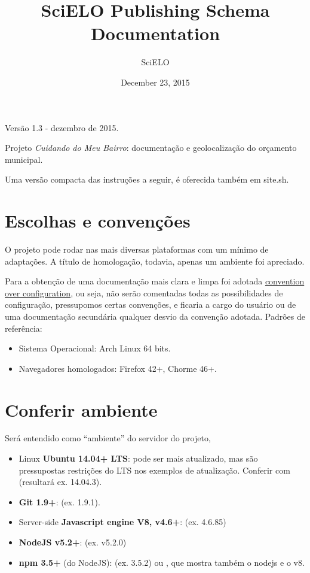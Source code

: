 \documentclass[letterpaper,10pt,english]{sphinxmanual}
\title{SciELO Publishing Schema Documentation}
\date{December 23, 2015}
\author{SciELO}
\begin{document}
\maketitle
\tableofcontents
{}\label{index::doc}


Versão 1.3 - dezembro de 2015.

Projeto \emph{Cuidando do Meu Bairro}: documentação e geolocalização do orçamento municipal.

Uma versão compacta das instruções a seguir, é oferecida também em site.sh.


\chapter{Escolhas e convenções}
\label{install-site::doc}\label{install-site:escolhas-e-convencoes}\label{install-site:cuidando-do-meu-bairro}
O projeto pode rodar nas mais diversas plataformas com um mínimo de
adaptações. A título de homologação, todavia, apenas um ambiente foi
apreciado.

Para a obtenção de uma documentação mais clara e limpa foi adotada
\href{https://en.wikipedia.org/wiki/Convention\_over\_configuration}{convention over
configuration},
ou seja, não serão comentadas todas as possibilidades de configuração,
pressupomos certas convenções, e ficaria a cargo do usuário ou de uma
documentação secundária qualquer desvio da convenção adotada. Padrões de
referência:
\begin{itemize}
\item {} 
Sistema Operacional: Arch Linux 64 bits.

\item {} 
Navegadores homologados: Firefox 42+, Chorme 46+.

\end{itemize}


\chapter{Conferir ambiente}
\label{install-site:conferir-ambiente}
Será entendido como ``ambiente'' do servidor do projeto,
\begin{itemize}
\item {} 
Linux \textbf{Ubuntu 14.04+ LTS}: pode ser mais atualizado, mas são
pressupostas restrições do LTS nos exemplos de atualização. Conferir
com  (resultará ex. 14.04.3).

\item {} 
\textbf{Git 1.9+}:  (ex. 1.9.1).

\item {} 
Server-side \textbf{Javascript engine V8, v4.6+}:
 (ex. 4.6.85)

\item {} 
\textbf{NodeJS v5.2+}: (ex. v5.2.0)

\item {} 
\textbf{npm 3.5+} (do NodeJS):  (ex. 3.5.2) ou ,
que mostra também o nodejs e o v8.

\end{itemize}
\end{document}
